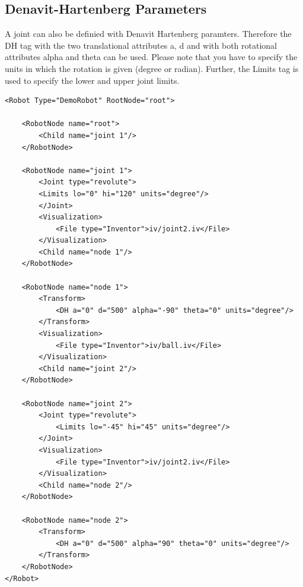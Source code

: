 \documentclass{book}
\begin{document}
\subsection{Denavit-Hartenberg Parameters}
\par
A joint can also be definied with Denavit Hartenberg paramters. Therefore the DH tag with the two translational attributes a, d and with both rotational attributes alpha and theta can be used. Please note that you have to specify the units in which the rotation is given (degree or radian). Further, the Limits tag is used to specify the lower and upper joint limits. 
\begin{lstlisting}
<Robot Type="DemoRobot" RootNode="root">

    <RobotNode name="root">
        <Child name="joint 1"/>
    </RobotNode>

    <RobotNode name="joint 1">
        <Joint type="revolute">
        <Limits lo="0" hi="120" units="degree"/>
        </Joint>
        <Visualization>
            <File type="Inventor">iv/joint2.iv</File>
        </Visualization>
        <Child name="node 1"/>
    </RobotNode>

    <RobotNode name="node 1">
        <Transform>
            <DH a="0" d="500" alpha="-90" theta="0" units="degree"/>
        </Transform>
        <Visualization>
            <File type="Inventor">iv/ball.iv</File>
        </Visualization>
        <Child name="joint 2"/>
    </RobotNode>

    <RobotNode name="joint 2">
        <Joint type="revolute">
            <Limits lo="-45" hi="45" units="degree"/>
        </Joint>
        <Visualization>
            <File type="Inventor">iv/joint2.iv</File>
        </Visualization>
        <Child name="node 2"/>
    </RobotNode>

    <RobotNode name="node 2">
        <Transform>
            <DH a="0" d="500" alpha="90" theta="0" units="degree"/>
        </Transform>
    </RobotNode>
</Robot>
\end{lstlisting}
\par
\end{document}
